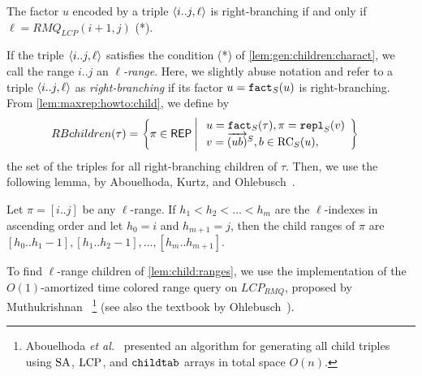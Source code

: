 \begin{lemma}\label{lem:gen:children:charact}
  The factor $u$ encoded by a triple $\langle i..j, \ell\rangle$ is right-branching if and only if $\ell = RMQ_{LCP}(i+1, j)$ (*). 
\end{lemma}

If the triple $\langle i..j, \ell\rangle$ satisfies the condition (*) of \cref{lem:gen:children:charact}, we call the range $i..j$ an \textit{$\ell$-range}.
Here, we slightly abuse notation and refer to a triple $\langle i..j, \ell\rangle$ as \textit{right-branching} if its factor $u = \mathtt{fact}_{S}(u)$ is right-branching. From \cref{lem:maxrep:howto:child}, we define by 
\begin{align}
  RBchildren(\tau)
  &= \left\{ \pi \in \mathsf{REP}
    \:\middle|\: 
    \begin{array}{l}
    u = \mathtt{fact}_{S}(\tau), 
    \pi = \mathtt{repl}_{S}(v)
    \\
    v = \overrightarrow{(ub)}^{S},
    b \in \mathrm{RC}_{S}(u),
    \end{array}
    \right\}
\end{align}
the set of the triples for all right-branching children of $\tau$. 
Then, we use the following lemma, by Abouelhoda, Kurtz, and Ohlebusch~\cite{abouelhoda2004replacing}. 

\begin{lemma}\label{lem:child:ranges}
  Let $\pi = [i..j]$ be any $\ell$-range.
  If $h_1 < h_2 < \dots < h_m$ are the $\ell$-indexes in ascending order and let $h_0 = i$ and $h_{m+1} = j$, then the child ranges of $\pi$ are
  $[h_0..h_1-1], 
   [h_1..h_2-1], 
   \ldots,
   [h_m..h_{m+1}]$.  
\end{lemma}

To find $\ell$-range children of \cref{lem:child:ranges}, we use the implementation of the $O(1)$-amortized time colored range query on $LCP_{RMQ}$, proposed by Muthukrishnan~\cite{muthukrishnan2002efficient}%
\footnote{
Abouelhoda \textit{et al.}~\cite{abouelhoda2004replacing} presented an algorithm for generating all child triples using 
$\mathrm{SA}$, $\mathrm{LCP}$, and $\mathtt{childtab}$ arrays in total space $O(n)$. 
}
(see also the textbook by Ohlebusch~\cite{ohlebusch2013bookbioinfo}).

